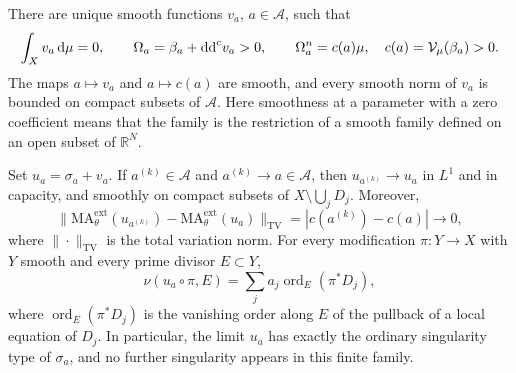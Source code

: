 \begin{proposition}\label{prop:finite-divisorial-equation-limits}
There are unique smooth functions $v_a$, $a\in\mathcal A$, such that
\[
 \int_Xv_a\,\mathrm{d}\mu=0,\qquad
 \Omega_a=\beta_a+\mathrm{dd}^{\mathrm{c}} v_a>0,\qquad
 \Omega_a^n=c(a)\mu,
 \quad c(a)=\mathcal V_\mu(\beta_a)>0.
\]
The maps $a\mapsto v_a$ and $a\mapsto c(a)$ are smooth, and every smooth norm of $v_a$ is bounded on compact subsets of $\mathcal A$. Here smoothness at a parameter with a zero coefficient means that the family is the restriction of a smooth family defined on an open subset of $\mathbb R^N$.

Set $u_a=\sigma_a+v_a$. If $a^{(k)}\in\mathcal A$ and $a^{(k)}\to a\in\mathcal A$, then $u_{a^{(k)}}\to u_a$ in $L^1$ and in capacity, and smoothly on compact subsets of $X\setminus\bigcup_jD_j$. Moreover,
\[
 \bigl\|\mathrm{MA}^{\mathrm{ext}}_\theta(u_{a^{(k)}})
       -\mathrm{MA}^{\mathrm{ext}}_\theta(u_a)\bigr\|_{\mathrm{TV}}
       =|c(a^{(k)})-c(a)|\longrightarrow0,
\]
where $\|\cdot\|_{\mathrm{TV}}$ is the total variation norm. For every modification $\pi\colon Y\to X$ with $Y$ smooth and every prime divisor $E\subset Y$,
\[
 \nu(u_a\circ\pi,E)=\sum_j a_j\operatorname{ord}_E(\pi^*D_j),
\]
where $\operatorname{ord}_E(\pi^*D_j)$ is the vanishing order along $E$ of the pullback of a local equation of $D_j$. In particular, the limit $u_a$ has exactly the ordinary singularity type of $\sigma_a$, and no further singularity appears in this finite family.
\end{proposition}
